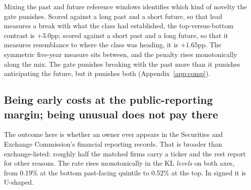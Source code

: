 Mixing the past and future reference windows identifies which kind of
novelty the gate punishes. Scored against a long past and a short future,
so that lead measures a break with what the class had established, the
top-versus-bottom contrast is $+3.0$pp; scored against a short past and a
long future, so that it measures resemblance to where the class was
heading, it is $+1.65$pp. The symmetric five-year measure sits between, and
the penalty rises monotonically along the mix. The gate punishes breaking
with the past more than it punishes anticipating the future, but it
punishes both (Appendix~\ref{app:comp}).

\subsection{Being early costs at the public-reporting margin; being unusual does not pay there}\label{sec:bluesea}

The outcome here is whether an owner ever appears in the Securities and
Exchange Commission's financial reporting records. That is broader than
exchange-listed: roughly half the matched firms carry a ticker and the rest
report for other reasons. The rate rises monotonically in
the KL \emph{levels} on both axes, from 0.19\% at the bottom past-facing
quintile to 0.52\% at the top. In signed \dkl{} it is U-shaped.

